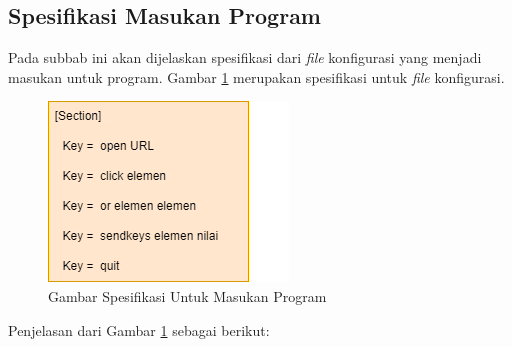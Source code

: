 \subsection{Spesifikasi Masukan Program}
\label{sec:spek}
Pada subbab ini akan dijelaskan spesifikasi dari \textit{file} konfigurasi yang menjadi masukan untuk program. Gambar \ref{fig:spek} merupakan spesifikasi untuk \textit{file} konfigurasi.
\begin{figure}[H]
	\centering
	\includegraphics[scale=0.7]{Gambar/strukturConf.png}
	\caption{Gambar Spesifikasi Untuk Masukan Program} 
	\label{fig:spek}
\end{figure}
Penjelasan dari Gambar \ref{fig:spek} sebagai berikut:
